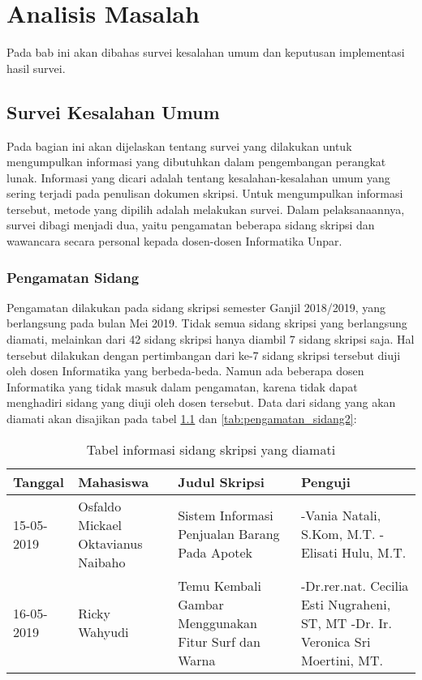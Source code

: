 \chapter{Analisis Masalah}
\label{chap:analisis}

Pada bab ini akan dibahas survei kesalahan umum dan keputusan implementasi hasil survei.

\section{Survei Kesalahan Umum}
\label{sec:survei}

Pada bagian ini akan dijelaskan tentang survei yang dilakukan untuk mengumpulkan informasi yang dibutuhkan dalam pengembangan perangkat lunak. Informasi yang dicari adalah tentang kesalahan-kesalahan umum yang sering terjadi pada penulisan dokumen skripsi. Untuk mengumpulkan informasi tersebut, metode yang dipilih adalah melakukan survei. Dalam pelaksanaannya, survei dibagi menjadi dua, yaitu pengamatan beberapa sidang skripsi dan wawancara secara personal kepada dosen-dosen Informatika Unpar. 

\subsection{Pengamatan Sidang}
Pengamatan dilakukan pada sidang skripsi semester Ganjil 2018/2019, yang berlangsung pada bulan Mei 2019. Tidak semua sidang skripsi yang berlangsung diamati, melainkan dari 42 sidang skripsi hanya diambil 7 sidang skripsi saja. Hal tersebut dilakukan dengan pertimbangan dari ke-7 sidang skripsi tersebut diuji oleh dosen Informatika yang berbeda-beda. Namun ada beberapa dosen Informatika yang tidak masuk dalam pengamatan, karena tidak dapat menghadiri sidang yang diuji oleh dosen tersebut. Data dari sidang yang akan diamati akan disajikan pada tabel \ref{tab:pengamatan_sidang1} dan \ref{tab:pengamatan_sidang2}:

\begin{table}[H]
	\renewcommand{\arraystretch}{1.5}
	\caption {Tabel informasi sidang skripsi yang diamati} 	
	\label{tab:pengamatan_sidang1}
	\begin{center}
		\begin{tabular}{|p{2 cm}|>{\raggedright} p{3.5 cm}| p{4.5 cm}| p{4.5 cm}|}
		\hline
		Tanggal & Mahasiswa & Judul Skripsi & Penguji \\ 
		\hline
		15-05-2019 & Osfaldo Mickael Oktavianus Naibaho & Sistem Informasi Penjualan Barang Pada Apotek & -Vania Natali, S.Kom, M.T. \newline -Elisati Hulu, M.T. \newline \\ 
		\hline
		16-05-2019 & Ricky Wahyudi & Temu Kembali Gambar Menggunakan Fitur Surf dan Warna & -Dr.rer.nat. Cecilia Esti Nugraheni, ST, MT \newline -Dr. Ir. Veronica Sri Moertini, MT. \newline \\ 
		\hline 
		\end{tabular}
	\end{center}
\end{table}

